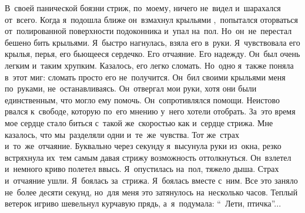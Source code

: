 В~своей панической боязни стриж, по~моему, ничего не~видел и~шарахался от~всего.
Когда я~подошла ближе он~взмахнул крыльями ,~попытался оторваться от~полированной поверхности подоконника и~упал на~пол.
Но~он~не~перестал бешено бить крыльями.
Я~быстро нагнулась, взяла его в~руки.
Я~чувствовала его крылья, перья, его бьющееся сердечко.
Его отчаяние.
Его надежду.
Он~был очень легким и~таким хрупким.
Казалось, его легко сломать.
Но~одно я~также поняла в~этот миг: сломать просто его не~получится.
Он~бил своими крыльями меня по~руками, не~останавливаясь.
Он~отвергал мои руки, хотя они были единственным, что могло ему помочь.
Он~сопротивлялся помощи.
Неистово рвался к~свободе, которую по~его мнению у~него хотели отобрать.
За~это время мое сердце стало биться с~такой же~скоростью как и~сердце стрижа.
Мне казалось, что мы~разделяли одни и~те~же~чувства.
Тот же~страх и~то~же~отчаяние.
Буквально через секунду я~высунула руки из~окна, резко встряхнула их~тем самым давая стрижу возможность оттолкнуться.
Он~взлетел и~немного криво полетел ввысь.
Я~опустилась на~пол, тяжело дыша.
Страх и~отчаяние ушли.
Я~боялась за~стрижа.
Я~боялась вместе с~ним.
Все это заняло не~более десяти секунд, но~для меня это затянулось на~несколько часов.
Теплый ветерок игриво шевельнул курчавую прядь, а~я~подумала: “~Лети, птичка”...

